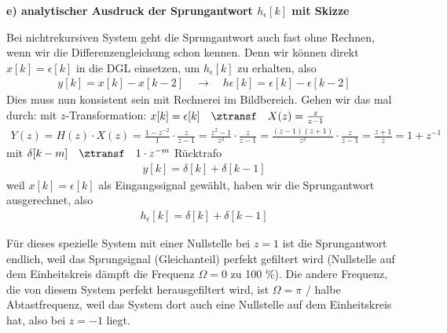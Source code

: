 \begin{Loesung}
\textbf{e) analytischer Ausdruck der Sprungantwort $h_\epsilon[k]$ mit Skizze}
%

Bei nichtrekursiven System geht die Sprungantwort auch fast ohne Rechnen,
wenn wir die Differenzengleichung schon kennen. Denn wir können direkt
$x[k] = \epsilon[k]$ in die DGL einsetzen, um $h_\epsilon[k]$ zu erhalten, also
\begin{align}
\label{eq:sec:F0EF9C3FA6_DGL2heps}
y[k] = x[k] - x[k-2]
\quad\rightarrow\quad
h\epsilon[k] = \epsilon[k] - \epsilon[k-2]
\end{align}
Dies muss nun konsistent sein mit Rechnerei im Bildbereich. Gehen wir das mal durch:
%
mit $z$-Transformation: $x[k] = \epsilon[k] \quad\ztransf\quad X(z) = \frac{z}{z-1}$
%
\begin{align}
\label{eq:F0EF9C3FA6_Hz_Sprung}
Y(z) = H(z) \cdot X(z) = \frac{1-z^{-2}}{1} \cdot \frac{z}{z-1} =
 \frac{z^2-1}{z^2} \cdot \frac{z}{z-1} =
\frac{(z-1)(z+1)}{z^2} \cdot \frac{z}{z-1} =
\frac{z+1}{z} = 1 + z^{-1}
\end{align}
%
mit $\delta[k-m]  \quad\ztransf\quad 1 \cdot z^{-m}$ Rücktrafo
%
\begin{align}
y[k] = \delta[k] + \delta[k-1]
\end{align}
%
weil $x[k] = \epsilon[k]$ als Eingangssignal gewählt, haben wir die Sprungantwort
ausgerechnet, also
%
\begin{align}
h_\epsilon[k] = \delta[k] + \delta[k-1]
\end{align}
%
\begin{center}
\end{center}

Für dieses spezielle System mit einer Nullstelle bei $z=1$ ist die Sprungantwort endlich,
weil das Sprungsignal (Gleichanteil) perfekt gefiltert wird (Nullstelle auf dem
Einheitskreis dämpft die Frequenz $\Omega=0$ zu 100 \%).
%
Die andere Frequenz, die von diesem System perfekt herausgefiltert wird, ist
$\Omega=\pi$ / halbe Abtastfrequenz, weil das System dort auch eine Nullstelle auf dem Einheitskreis hat,
also bei $z=-1$ liegt.


\end{Loesung}
